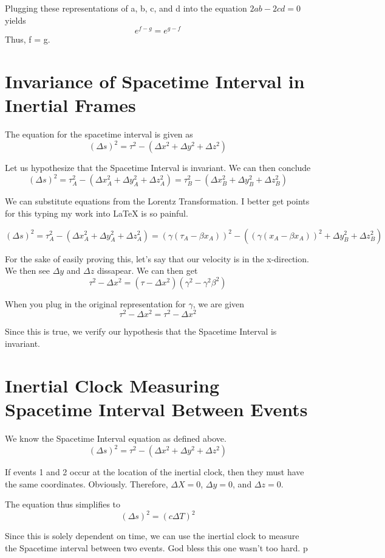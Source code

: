 \documentclass{article}
\begin{document}
Plugging these representations of a, b, c, and d into the equation \(2ab - 2cd = 0\) yields
\[
  e^{f - g} = e^{g - f}
\]
Thus, f = g.

\newpage
\section{Invariance of Spacetime Interval in Inertial Frames}
The equation for the spacetime interval is given as
\[
  (\Delta s)^2 = \tau^2 - (\Delta x^2 + \Delta y^2 + \Delta z^2)
\]

Let us hypothesize that the Spacetime Interval is invariant. We can then conclude
\[
  (\Delta s)^2 = \tau_A^2 - (\Delta x_A^2 + \Delta y_A^2 + \Delta z_A^2) = \tau_B^2 - (\Delta x_B^2 + \Delta y_B^2 + \Delta z_B^2)
\]

We can substitute equations from the Lorentz Transformation. I better get points for this typing my work into LaTeX is so painful.

\[
  (\Delta s)^2 = \tau_A^2 - (\Delta x_A^2 + \Delta y_A^2 + \Delta z_A^2) = (\gamma (\tau_A - \beta x_A))^2 - ((\gamma (x_A - \beta x_A))^2 + \Delta y_B^2 + \Delta z_B^2)
\]

For the sake of easily proving this, let's say that our velocity is in the x-direction. We then see \(\Delta y\) and \(\Delta z\) dissapear. We can then get
\[
  \tau^2 - \Delta x^2 = (\tau - \Delta x^2)(\gamma^2 - \gamma^2 \beta^2)
\]

When you plug in the original representation for \(\gamma\), we are given
\[
  \tau^2 - \Delta x^2 = \tau^2 - \Delta x^2
\]

Since this is true, we verify our hypothesis that the Spacetime Interval is invariant.

\newpage
\section{Inertial Clock Measuring Spacetime Interval Between Events}
We know the Spacetime Interval equation as defined above.
\[
  (\Delta s)^2 = \tau^2 - (\Delta x^2 + \Delta y^2 + \Delta z^2)
\]

If events 1 and 2 occur at the location of the inertial clock, then they must have the same coordinates. Obviously. Therefore, \(\Delta X = 0\), \(\Delta y = 0\), and \(\Delta z = 0\).

The equation thus simplifies to
\[
  (\Delta s)^2 = (c\Delta T)^2
\]

Since this is solely dependent on time, we can use the inertial clock to measure the Spacetime interval between two events. God bless this one wasn't too hard.
p
\newpage
\end{document}
